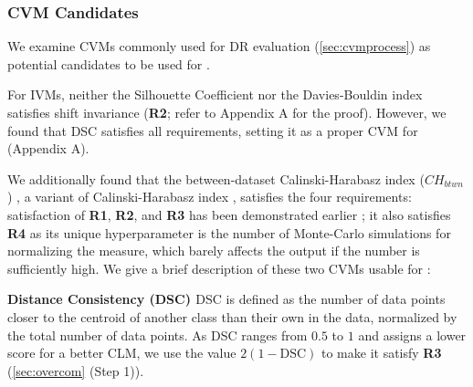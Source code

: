 \subsubsection{CVM Candidates}
\label{sec:lsc-examples}

We examine CVMs commonly used for DR evaluation (\autoref{sec:cvmprocess}) as potential candidates to be used for \ltc. 

For IVMs,  neither the Silhouette Coefficient \cite{rousseuw87silhouette} nor the Davies-Bouldin index \cite{davies79tpami} satisfies shift invariance (\textbf{R2}; refer to Appendix A for the proof). However, we found that DSC satisfies all requirements, setting it as a proper CVM for \ltc (Appendix A).


We additionally found that the between-dataset Calinski-Harabasz index ($CH_{btwn}$) \cite{jeon22arxiv2}, a variant of Calinski-Harabasz index \cite{calinski74cis}, satisfies the four requirements: satisfaction of \textbf{R1}, \textbf{R2}, and \textbf{R3} has been demonstrated earlier \cite{jeon22arxiv2}; it also satisfies \textbf{R4} as its unique hyperparameter is the number of Monte-Carlo simulations for normalizing the measure, which barely affects the output if the number is sufficiently high.
We give a brief description of these two CVMs usable for \ltc:

\noindent
\textbf{Distance Consistency (DSC) \cite{sips09cgf}} DSC is defined as the number of data points closer to the centroid of another class than their own in the data, normalized by the total number of data points.  As DSC ranges from $0.5$ to $1$  and assigns a lower score for a better CLM, we use the value $2(1 - \text{DSC})$ to make it satisfy \textbf{R3} (\autoref{sec:overcom} (Step 1)).

